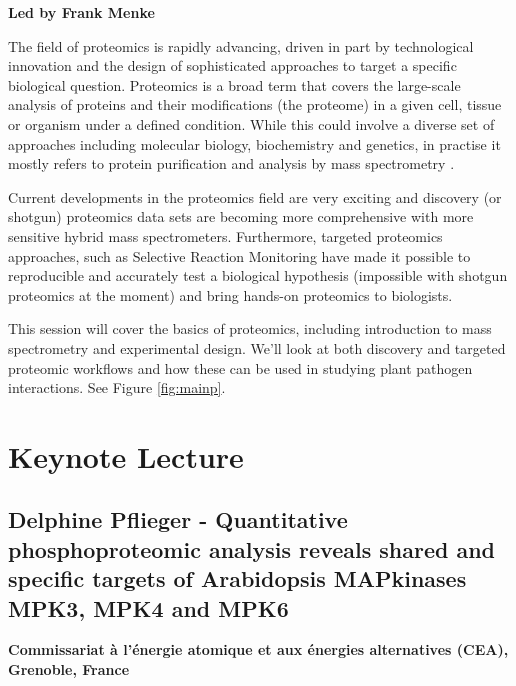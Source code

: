 \documentclass[12pt,]{book}
\theoremstyle{definition}
\theoremstyle{definition}
\theoremstyle{remark}
\begin{document}
\textbf{Led by Frank Menke}

The field of proteomics is rapidly advancing, driven in part by
technological innovation and the design of sophisticated approaches to
target a specific biological question. Proteomics is a broad term that
covers the large-scale analysis of proteins and their modifications (the
proteome) in a given cell, tissue or organism under a defined condition.
While this could involve a diverse set of approaches including molecular
biology, biochemistry and genetics, in practise it mostly refers to
protein purification and analysis by mass spectrometry
\citep{Aebersold:2016kt}.

Current developments in the proteomics field are very exciting and
discovery (or shotgun) proteomics data sets are becoming more
comprehensive with more sensitive hybrid mass spectrometers.
Furthermore, targeted proteomics approaches, such as Selective Reaction
Monitoring \citep{Picotti:2013jp} have made it possible to reproducible
and accurately test a biological hypothesis (impossible with shotgun
proteomics at the moment) and bring hands-on proteomics to biologists.

This session will cover the basics of proteomics, including introduction
to mass spectrometry and experimental design. We'll look at both
discovery and targeted proteomic workflows and how these can be used in
studying plant pathogen interactions. See Figure \ref{fig:mainp}.

\section*{Keynote Lecture}\label{keynote-lecture-6}

\subsection*{Delphine Pflieger - Quantitative phosphoproteomic analysis
reveals shared and specific targets of Arabidopsis MAPkinases MPK3, MPK4
and
MPK6}\label{delphine-pflieger---quantitative-phosphoproteomic-analysis-reveals-shared-and-specific-targets-of-arabidopsis-mapkinases-mpk3-mpk4-and-mpk6}

\textbf{Commissariat à l'énergie atomique et aux énergies alternatives
(CEA), Grenoble, France}
\end{document}
